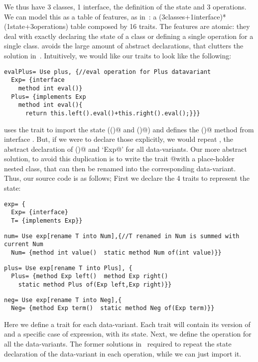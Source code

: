 We thus have 3 classes, 1 interface,
the definition of the state and 3 operations.
We can model this
as a table of features, as in~\cite{deep}:
a (3classes+1interface)*(1state+3operations)
table composed by 16 traits.
The features are atomic: they deal with exactly 
declaring the state of a class
or defining a single operation for a single class.
\name avoids the large amount of abstract declarations,
that clutters the solution in~\cite{deep}.
Intuitively, we would like our traits to look like the following:
\begin{lstlisting}
evalPlus= Use plus, {//eval operation for Plus datavariant
  Exp= {interface
    method int eval()}
  Plus= {implements Exp
    method int eval(){
      return this.left().eval()+this.right().eval();}}}
\end{lstlisting}
\Q@evalPlus@ uses the trait \Q@plus@ to import the state (\Q@left()@ and \Q@right()@)
and defines the \Q@eval()@ method from interface \Q@Exp@.
But, if we were to declare those
explicitly, we would repeat \Q@Exp@, the abstract
declaration of \Q@eval()@ and `\Q@implements Exp@'
for all data-variants.
Our more abstract solution, to avoid this duplication is to write 
the trait \Q@eval @with a place-holder \Q@T@ nested class, that can then be renamed
into the corresponding data-variant.
Thus, our source code is as follows;
First we declare the 4 traits to represent the state:
\newcommand\multiCode{\vspace{-5pt}}
\saveSpace
\begin{lstlisting}
exp= {
  Exp= {interface}
  T= {implements Exp}}
\end{lstlisting}
\multiCode
\begin{lstlisting}
num= Use exp[rename T into Num],{//T renamed in Num is summed with current Num
  Num= {method int value()  static method Num of(int value)}}
\end{lstlisting}
\multiCode
\begin{lstlisting}
plus= Use exp[rename T into Plus], {
  Plus= {method Exp left()  method Exp right()
    static method Plus of(Exp left,Exp right)}}
\end{lstlisting}
\multiCode
\begin{lstlisting}
neg= Use exp[rename T into Neg],{
  Neg= {method Exp term()  static method Neg of(Exp term)}}
\end{lstlisting}
Here we define a trait for each data-variant.
Each trait will contain its version of \Q@Exp@
and a specific case of expression, with its state.
Next, we define the operation \Q@eval@ for all the data-variants.
The former solutions in~\cite{deep}
required to repeat the state declaration of the 
data-variant in each operation, while we can just import it.

